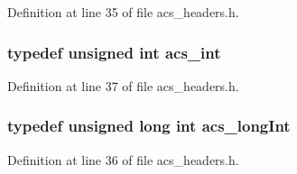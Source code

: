Definition at line 35 of file acs\+\_\+headers.\+h.

\hypertarget{a00051_a8d277355641a098190360234e2ebde35}{
\subsubsection[{acs\+\_\+int}]{\setlength{\rightskip}{0pt plus 5cm}typedef unsigned int {\bf acs\+\_\+int}}}\label{a00051_a8d277355641a098190360234e2ebde35}


Definition at line 37 of file acs\+\_\+headers.\+h.

\hypertarget{a00051_a19319d75f02db4308bc5c0026d98cd85}{
\subsubsection[{acs\+\_\+long\+Int}]{\setlength{\rightskip}{0pt plus 5cm}typedef unsigned long int {\bf acs\+\_\+long\+Int}}}\label{a00051_a19319d75f02db4308bc5c0026d98cd85}


Definition at line 36 of file acs\+\_\+headers.\+h.

